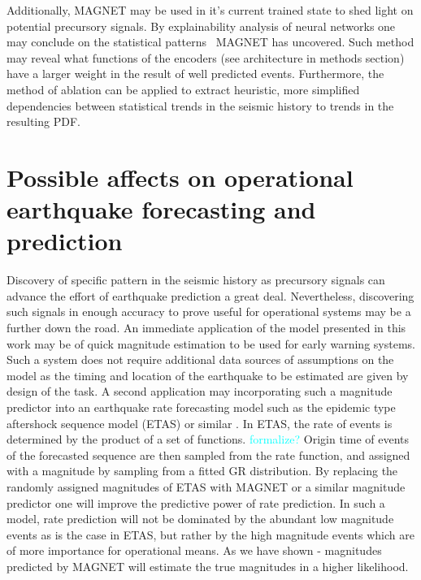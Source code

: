 \documentclass[pdflatex]{sn-jnl}
\newcommand{\neri}[1]{{\textcolor{cyan}{#1}}}
\begin{document}
Additionally, MAGNET may be used in it's current trained state to shed light on potential precursory signals.
By explainability analysis of neural networks \cite{sturmfels_visualizing_2020, zhang_survey_2021, liu_interpretable_2023} one may conclude on the statistical patterns ~MAGNET has uncovered. Such method may reveal what functions of the encoders (see architecture in methods section) have a larger weight in the result of well predicted events. Furthermore, the method of ablation \cite{meyes_ablation_2019, sturmfels_visualizing_2020} can be applied to extract heuristic, more simplified dependencies between statistical trends in the seismic history to trends in the resulting PDF.


\section{Possible affects on operational earthquake forecasting and prediction}
Discovery of specific pattern in the seismic history as precursory signals can advance the effort of earthquake prediction a great deal\cite{mousavi_deep-learning_2022, mousavi_machine_2023, mignan_neural_2020, karimpouli_explainable_2023, bergen_machine_2019}. Nevertheless, discovering such signals in enough accuracy to prove useful for operational systems may be a further down the road.
An immediate application of the model presented in this work may be of quick magnitude estimation to be used for early warning systems. Such a system does not require additional data sources of assumptions on the model as the timing and location of the earthquake to be estimated are given by design of the task. 
A second application may incorporating such a magnitude predictor into an earthquake rate forecasting model such as the epidemic type aftershock sequence model (ETAS) or similar \cite{ogata_statistical_1988, ogata_statistics_2017, dascher-cousineau_using_2023}. In ETAS, the rate of events is determined by the product of a set of functions. \neri{formalize?} Origin time of events of the forecasted sequence are then sampled from the rate function, and assigned with a magnitude by sampling from a fitted GR distribution. By replacing the randomly assigned magnitudes of ETAS with MAGNET or a similar magnitude predictor one will improve the predictive power of rate prediction. In such a model, rate prediction will not be dominated by the abundant low magnitude events as is the case in ETAS, but rather by the high magnitude events which are of more importance for operational means. As we have shown - magnitudes predicted by MAGNET will estimate the true magnitudes in a higher likelihood.
\end{document}
